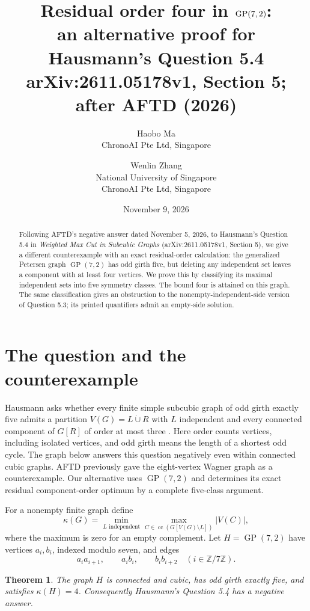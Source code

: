 \documentclass[11pt]{article}
\title{Residual order four in $\GP(7,2)$:\\
  an alternative proof for Hausmann's Question 5.4\\
  \large arXiv:2611.05178v1, Section 5; after AFTD (2026)}
\author{Haobo Ma\\\small ChronoAI Pte Ltd, Singapore
  \and Wenlin Zhang\\\small National University of Singapore\\
  \small ChronoAI Pte Ltd, Singapore}
\date{November 9, 2026}
\newtheorem{theorem}{Theorem}
\newcommand{\GP}{\operatorname{GP}}
\newcommand{\cc}{\operatorname{cc}}
\begin{document}
\maketitle
\begin{abstract}
Following AFTD's negative answer dated November 5, 2026, to Hausmann's
Question 5.4 in \emph{Weighted Max Cut in Subcubic Graphs}
(arXiv:2611.05178v1, Section 5), we give a different counterexample
with an exact residual-order calculation: the generalized
Petersen graph $\GP(7,2)$ has odd girth five, but deleting any independent
set leaves a component with at least four vertices. We prove this by
classifying its maximal independent sets into five symmetry classes.
The bound four is attained on this graph.
The same classification gives an obstruction to the nonempty-independent-side
version of Question 5.3; its printed quantifiers admit an empty-side solution.
\end{abstract}

\section{The question and the counterexample}
Hausmann asks whether every finite simple subcubic graph of odd girth
exactly five admits a partition $V(G)=L\mathbin{\dot\cup}R$ with $L$
independent and every connected component of $G[R]$ of order at most
three \cite[Question 5.4]{hausmann}. Here order counts vertices, including
isolated vertices, and odd girth means the length of a shortest odd cycle.
The graph below answers this question negatively even within connected cubic graphs.
AFTD \cite{aftd} previously gave the eight-vertex Wagner graph as a
counterexample. Our alternative uses $\GP(7,2)$ and determines its exact
residual component-order optimum by a complete five-class argument.

For a nonempty finite graph define
\[
 \kappa(G)=\min_{L\text{ independent}}
       \max_{C\in\cc(G[V(G)\setminus L])}|V(C)|,
\]
where the maximum is zero for an empty complement.
Let $H=\GP(7,2)$ have vertices $a_i,b_i$, indexed modulo seven, and edges
\begin{equation}\label{eq:edges}
 a_i a_{i+1},\qquad a_i b_i,\qquad b_i b_{i+2}
 \quad(i\in\mathbb Z/7\mathbb Z).
\end{equation}
\begin{theorem}\label{thm:main}
The graph $H$ is connected and cubic, has odd girth exactly five, and
satisfies $\kappa(H)=4$. Consequently Hausmann's Question 5.4 has a
negative answer.
\end{theorem}
\end{document}

